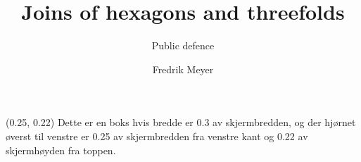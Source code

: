 \documentclass[UKenglish]{beamer}
\title[Hexagons and \CY threefolds]{Joins of hexagons and \texorpdfstring{\CY}{Calabi--Yau} threefolds}
\subtitle{Public defence}
\author{Fredrik Meyer}
\begin{document}
\begin{frame}

    \begin{textblock}{0.3}(0.25, 0.22)
        Dette er en boks hvis bredde er \alert{0.3} av skjermbredden, og der hjørnet øverst til venstre er \alert{0.25} av skjermbredden fra venstre kant og \alert{0.22} av skjermhøyden fra toppen.
    \end{textblock}

\end{frame}
\end{document}

